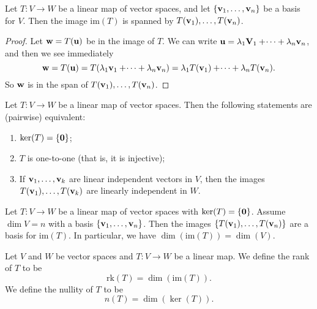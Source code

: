 \documentclass[10pt, a4paper]{article}
\begin{document}
\begin{lemma}
    Let $T : V \rightarrow W$ be a linear map of vector spaces,
    and let $\{\mathbf{v}_1, \dotsc, \mathbf{v}_n\}$ be a basis for $V$.
    Then the image $\mathrm{im}(T)$ is spanned by $T(\mathbf{v}_1), \dotsc, T(\mathbf{v}_n)$.
    \begin{proof}
        Let $\mathbf{w} = T(\mathbf{u})$ be in the image of $T$.
        We can write $\mathbf{u} = \lambda_1\mathbf{V}_1 + \dotsi + \lambda_n\mathbf{v}_n$,
        and then we see immediately
        \[
        \mathbf{w} = T(\mathbf{u}) = T(\lambda_1\mathbf{v}_1 + \dotsi + \lambda_n\mathbf{v}_n) = \lambda_1T(\mathbf{v}_1) + \dotsi + \lambda_nT(\mathbf{v}_n).
        \]
        So $\mathbf{w}$ is in the span of $T(\mathbf{v}_1), \dotsc, T(\mathbf{v}_n)$.
    \end{proof}
\end{lemma}

\begin{proposition}
    Let $T : V \rightarrow W$ be a linear map of vector spaces.
    Then the following statements are
    (pairwise)
    equivalent:
    \begin{enumerate}[label = (\roman*)]
        \item $\ker(T) = \{\mathbf{0}\}$;
        \item $T$ is one-to-one
        (that is,
        it is injective);
        \item If $\mathbf{v}_1, \dotsc, \mathbf{v}_k$ are linear independent vectors in $V$,
        then the images $T(\mathbf{v}_1), \dotsc, T(\mathbf{v}_k)$ are linearly independent in $W$.
    \end{enumerate}
\end{proposition}

\begin{corollary}
    Let $T : V \rightarrow W$ be a linear map of vector spaces with $\ker(T) = \{\mathbf{0}\}$.
    Assume $\dim{V} = n$ with a basis $\{\mathbf{v}_1, \dotsc, \mathbf{v}_n\}$.
    Then the images $\{T(\mathbf{v}_1), \dotsc, T(\mathbf{v}_n)\}$ are a basis for $\mathrm{im}(T)$.
    In particular,
    we have $\dim(\mathrm{im}(T)) = \dim(V)$.
\end{corollary}

\begin{definition}
    Let $V$ and $W$ be vector spaces and $T : V \rightarrow W$ be a linear map.
    We define the rank of $T$ to be
    \[
    \mathrm{rk}(T) = \dim(\mathrm{im}(T)).
    \]
    We define the nullity of $T$ to be
    \[
    n(T) = \dim(\ker(T)).
    \]
\end{definition}
\end{document}
